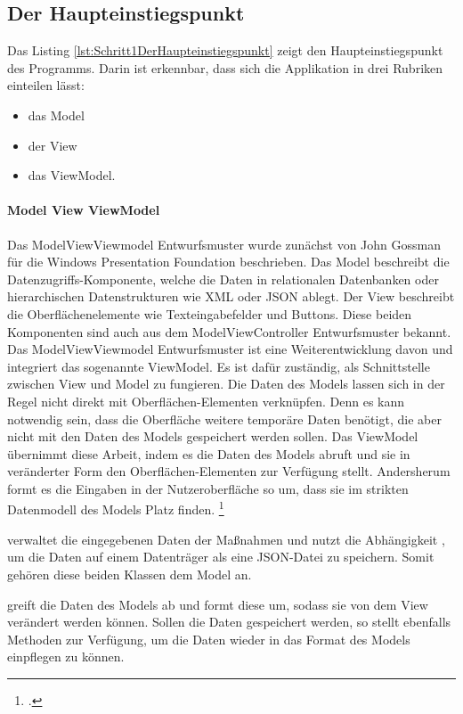
\clearpage
\subsection{Der Haupteinstiegspunkt}

Das Listing \ref{lst:Schritt1DerHaupteinstiegspunkt} zeigt den Haupteinstiegspunkt des Programms.
Darin ist erkennbar, dass sich die Applikation in drei Rubriken einteilen lässt:
\begin{itemize}
  \item das Model 
  \item der View 
  \item das ViewModel. 
\end{itemize}
\paragraph{Model View ViewModel}
Das ModelViewViewmodel Entwurfsmuster wurde zunächst von John Gossman für die Windows Presentation Foundation beschrieben.
Das Model beschreibt die Datenzugriffs-Komponente, welche die Daten in relationalen Datenbanken oder hierarchischen Datenstrukturen wie XML oder JSON ablegt.
Der View beschreibt die Oberflächenelemente wie Texteingabefelder und Buttons.
Diese beiden Komponenten sind auch aus dem ModelViewController Entwurfsmuster bekannt.
Das ModelViewViewmodel Entwurfsmuster ist eine Weiterentwicklung davon und integriert das sogenannte ViewModel.
Es ist dafür zuständig, als Schnittstelle zwischen View und Model zu fungieren.
Die Daten des Models lassen sich in der Regel nicht direkt mit Oberflächen-Elementen verknüpfen.
Denn es kann notwendig sein, dass die Oberfläche weitere temporäre Daten benötigt, die aber nicht mit den Daten des Models gespeichert werden sollen.
Das ViewModel übernimmt diese Arbeit, indem es die Daten des Models abruft und sie in veränderter Form den Oberflächen-Elementen zur Verfügung stellt.
Andersherum formt es die Eingaben in der Nutzeroberfläche so um, dass sie im strikten Datenmodell des Models Platz finden.
\footcite[Vgl.][]{IntroductionToModelViewViewModelPatternForBuildingWPFApps}

  verwaltet die eingegebenen Daten der Maßnahmen und nutzt die Abhängigkeit  , um die Daten auf einem Datenträger als eine JSON-Datei zu speichern.
Somit gehören diese beiden Klassen dem Model an.

  greift die Daten des Models ab und formt diese um, sodass sie von dem View   verändert werden können.
Sollen die Daten gespeichert werden, so stellt  ebenfalls Methoden zur Verfügung, um die Daten wieder in das Format des Models einpflegen zu können.

